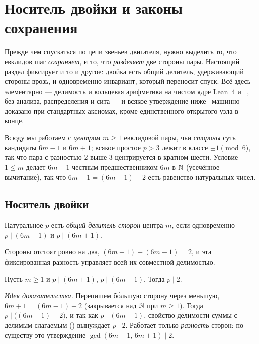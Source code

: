 \section{Носитель двойки и законы сохранения}\label{sec:carrier}

Прежде чем спускаться по цепи звеньев двигателя, нужно выделить то, что евклидов шаг
\emph{сохраняет}, и то, что \emph{разделяет} две стороны пары. Настоящий раздел фиксирует и то и
другое: двойка есть общий делитель, удерживающий стороны врозь, и одновременно инвариант, который
переносит спуск. Всё здесь элементарно --- делимость и кольцевая арифметика на чистом ядре
Lean~4 и ~\cite{lean4,mathlib}, без анализа, распределения и сита --- и всякое
утверждение ниже \green{}~машинно доказано при стандартных аксиомах, кроме единственного открытого
узла в конце.

Всюду мы работаем с \emph{центром} $m\ge 1$ евклидовой пары, чьи \emph{стороны} суть кандидаты
$6m-1$ и $6m+1$; всякое простое $p>3$ лежит в классе $\pm1\pmod 6$, так что пара с разностью $2$
выше $3$ центрируется в кратном шести. Условие $1\le m$ делает $6m-1$ честным предшественником $6m$
в $\mathbb{N}$ (усечённое вычитание), так что $6m+1=(6m-1)+2$ есть равенство натуральных чисел.

\subsection{Носитель двойки}

\begin{definition}\label{def:shared-divisor}
Натуральное $p$ есть \emph{общий делитель сторон} центра $m$, если одновременно $p\mid(6m-1)$ и
$p\mid(6m+1)$.
\end{definition}

Стороны отстоят ровно на два, $(6m+1)-(6m-1)=2$, и эта фиксированная разность управляет всей их
совместной делимостью.

\begin{theorem}\label{thm:twin_sides_shared_dvd_two}
\green{} Пусть $m\ge 1$ и $p\mid(6m+1)$, $p\mid(6m-1)$. Тогда $p\mid 2$.
\end{theorem}

\emph{Идея доказательства.} Перепишем б\'{о}льшую сторону через меньшую, $6m+1=(6m-1)+2$ (закрывается
 над $\mathbb{N}$ при $m\ge1$). Тогда $p\mid\bigl((6m-1)+2\bigr)$, и так как $p\mid(6m-1)$,
свойство делимости суммы с делимым слагаемым () вынуждает $p\mid 2$.
Работает только \emph{разность} сторон: по существу это утверждение $\gcd(6m-1,\,6m+1)\mid 2$.

